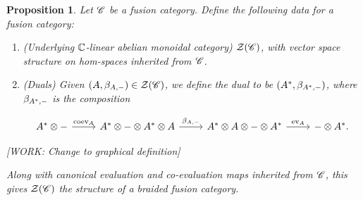\documentclass{article}
\newtheorem{proposition}{Proposition}[section]
\theoremstyle{definition}
\numberwithin{figure}{section}
\begin{document}
\begin{proposition} Let $\mathscr{C}$ be a fusion category. Define the following data for a fusion category:

\begin{enumerate}
\item (Underlying $\mathbb{C}$-linear abelian monoidal category) $\mathcal{Z}(\mathscr{C})$, with vector space structure on hom-spaces inherited from $\mathscr{C}$.

\item (Duals) Given $(A,\beta_{A,\--})\in \mathcal{Z}(\mathscr{C})$, we define the dual to be $(A^*,\beta_{A^*,\--})$, where $\beta_{A^*,\--}$ is the composition

\[\begin{tikzcd}
	{A^*\otimes \--} & {A^*\otimes \-- \otimes A^*\otimes A} & {A^*\otimes A\otimes \-- \otimes A^*} & {\--\otimes A^*}.
	\arrow["{\coev_{A}}", from=1-1, to=1-2]
	\arrow["{\beta_{A,\--}}", from=1-2, to=1-3]
	\arrow["{\ev_A}", from=1-3, to=1-4]
\end{tikzcd}\]
\end{enumerate}

[WORK: Change to graphical definition]

Along with canonical evaluation and co-evaluation maps inherited from $\mathscr{C}$, this gives $\mathcal{Z}(\mathscr{C})$ the structure of a braided fusion category.
\end{proposition}
\end{document}
